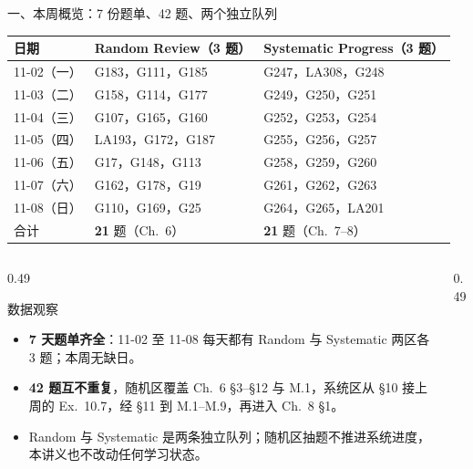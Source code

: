 \documentclass[aspectratio=169,10pt,fontset=none]{ctexbeamer}
\begin{document}
\begin{frame}[t]{一、本周概览：7 份题单、42 题、两个独立队列}
  \label{sec:overview}
  \centering
  \scriptsize
  \setlength{\tabcolsep}{3pt}
  \renewcommand{\arraystretch}{1.14}
  \begin{tabular}{@{}l l l@{}}
    \toprule
    日期 & Random Review（3 题） & Systematic Progress（3 题）\\
    \midrule
    11-02（一） & G183，G111，G185 & G247，LA308，G248\\
    11-03（二） & G158，G114，G177 & G249，G250，G251\\
    11-04（三） & G107，G165，G160 & G252，G253，G254\\
    11-05（四） & LA193，G172，G187 & G255，G256，G257\\
    11-06（五） & G17，G148，G113 & G258，G259，G260\\
    \rowcolor{ink!7} 11-07（六） & G162，G178，G19 & G261，G262，G263\\
    \rowcolor{ink!7} 11-08（日） & G110，G169，G25 & G264，G265，LA201\\
    \midrule
    合计 & \textbf{21} 题（Ch.~6） & \textbf{21} 题（Ch.~7--8）\\
    \bottomrule
  \end{tabular}
  \vspace{0.35em}
  \raggedright
  \begin{columns}[T,onlytextwidth]
    \begin{column}{0.49\textwidth}
      \begin{exampleblock}{\footnotesize 数据观察}
        \scriptsize
        \begin{itemize}\setlength{\itemsep}{1pt}
          \item \textbf{7 天题单齐全}：11-02 至 11-08 每天都有 Random 与 Systematic 两区各 3 题；本周无缺日。
          \item \textbf{42 题互不重复}，随机区覆盖 Ch.~6 \S3--\S12 与 M.1，系统区从 \S10 接上周的 Ex.~10.7，经 \S11 到 M.1--M.9，再进入 Ch.~8 \S1。
          \item Random 与 Systematic 是两条独立队列；随机区抽题不推进系统进度，本讲义也不改动任何学习状态。
        \end{itemize}
      \end{exampleblock}
    \end{column}
    \begin{column}{0.49\textwidth}

\end{column}
\end{columns}
\end{frame}
\end{document}
